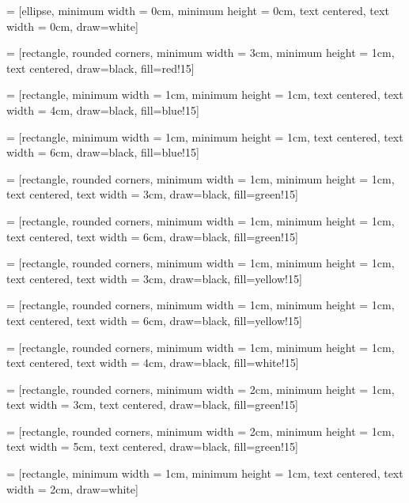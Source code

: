 \RequirePackage{tikz}



 =
[ellipse, minimum width = 0cm, minimum height = 0cm, text centered,
text width = 0cm, draw=white]

 =
[rectangle, rounded corners, minimum width = 3cm, minimum height = 1cm,
text centered, draw=black, fill=red!15]

 =
[rectangle, minimum width = 1cm, minimum height = 1cm, text centered, 
text width = 4cm, draw=black, fill=blue!15]

 =
[rectangle, minimum width = 1cm, minimum height = 1cm, text centered, 
text width = 6cm, draw=black, fill=blue!15]

 =
[rectangle, rounded corners, minimum width = 1cm, minimum height = 1cm,
text centered, text width = 3cm, draw=black, fill=green!15]

 =
[rectangle, rounded corners, minimum width = 1cm, minimum height = 1cm,
text centered, text width = 6cm, draw=black, fill=green!15]

 =
[rectangle, rounded corners, minimum width = 1cm, minimum height = 1cm,
text centered, text width = 3cm, draw=black, fill=yellow!15]

 =
[rectangle, rounded corners, minimum width = 1cm, minimum height = 1cm, 
text centered, text width = 6cm, draw=black, fill=yellow!15]

 =
[rectangle, rounded corners, minimum width = 1cm, minimum height = 1cm, 
text centered, text width = 4cm, draw=black, fill=white!15]

 = 
[rectangle, rounded corners, minimum width = 2cm, minimum height = 1cm, 
text width = 3cm, text centered, draw=black, fill=green!15]

 = 
[rectangle, rounded corners, minimum width = 2cm, minimum height = 1cm, 
text width = 5cm, text centered, draw=black, fill=green!15]

 = 
[rectangle, minimum width = 1cm, minimum height = 1cm, text centered, 
text width = 2cm, draw=white]

